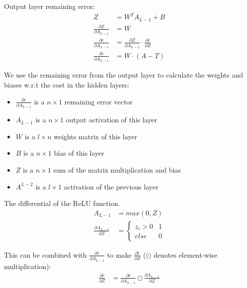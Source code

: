Output layer remaining error:
\begin{equation}
    \begin{aligned}
        Z &= W^{T}A_{L-1} + B\\
        \frac{\partial Z}{\partial A_{L-1}} &= W\\[2em]
        \frac{\partial c}{\partial A_{L-1}} &= \frac{\partial Z}{\partial A_{L-1}} \cdot \frac{\partial c}{\partial Z}\\
        \frac{\partial c}{\partial A_{L-1}} &= W \cdot (A - T)
    \end{aligned}
\end{equation}

We use the remaining error from the output layer to calculate the weights and
biases w.r.t the cost in the hidden layers:
\begin{itemize}
    \item \( \frac{\partial c}{\partial A_{L-1}} \) is a \( n \times 1 \) remaining error vector 
    \item \( A_{L-1} \) is a  \( n \times 1 \) output activation of this layer
    \item \( W \) is a \( l \times n \) weights matrix of this layer
    \item \( B \) is a \( n \times 1 \) bias of this layer
    \item \( Z \) is a \( n \times 1 \) sum of the matrix multiplication and bias
    \item \(A^{L-2} \) is a \( l \times 1 \) activation of the previous layer
\end{itemize}
\clearpage
The differential of the ReLU function.
\begin{equation}
    \begin{aligned}
        A_{L-1} &= max(0,Z)\\[2em]
        \frac{\partial A_{L-1}}{\partial Z} &= 
        \begin{cases}
            z_{i} > 0 & 1 \\
            else & 0
        \end{cases}
    \end{aligned}
\end{equation}

This can be combined with \( \frac{\partial c}{\partial A_{L-1}} \) to make \(
\frac{\partial c}{\partial Z} \) (\( \odot \) denotes element-wise
multiplication):
\begin{equation}
    \begin{aligned}
        \frac{\partial c}{\partial Z} &= \frac{\partial c}{\partial A_{L-1}} \odot \frac{\partial A_{L-1}}{\partial Z}\\
    \end{aligned}
\end{equation}

